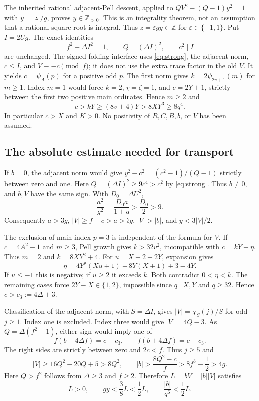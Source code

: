\documentclass[11pt]{article}
\theoremstyle{definition}
\newcommand{\Z}{\mathbb Z}\newcommand{\N}{\mathbb N}\newcommand{\Q}{\mathbb Q}
\begin{document}
The inherited rational adjacent-Pell descent, applied to
$QV^2-(Q-1)y^2=1$ with $y=|z|/g$, proves $y\in\Z_{>0}$.
This is an integrality theorem, not an assumption that a rational square
root is integral. Thus $z=\varepsilon gy\in\Z$ for
$\varepsilon\in\{-1,1\}$. Put $I=2Ug$. The exact identities
\begin{equation}\label{eq:strong}
 f^2-\Delta I^2=1,\qquad Q=(\Delta I)^2,\qquad c^2\mid I
\end{equation}
are unchanged. The signed folding interface uses \eqref{eq:strong},
the adjacent norm, $c\le I$, and $V\equiv-c\pmod f$; it does not use
the extra trace factor in the old $V$. It yields
$c=\psi_A(p)$ for a positive odd $p$.
The first norm gives $k=2\psi_{2v+1}(m)$ for $m\ge1$.
Index $m=1$ would force $k=2$, $\eta=\zeta=1$, and
$c=2Y+1$, strictly between the first two positive main ordinates.
Hence $m\ge2$ and
\begin{equation}\label{eq:earlyc}
              c>kY\ge(8v+4)Y>8XY^3\ge8q^4.
\end{equation}
In particular $c>X$ and $K>0$. No positivity of $R,C,B,b$, or $V$
has been assumed.

\subsection{The absolute estimate needed for transport}

If $b=0$, the adjacent norm would give
$y^2-c^2=(c^2-1)/(Q-1)$ strictly between zero and one.
Here $Q=(\Delta I)^2\ge9c^4>c^2$ by \eqref{eq:strong}.
Thus $b\ne0$, and $b,V$ have the same sign. With $D_0=\Delta U^2$,
\[
 \frac{a^2}{g^2}=\frac{D_0a}{1+a}>\frac{D_0}{2}>9.
\]
Consequently $a>3g$, $|V|\ge f-c>a>3g$, $|V|>|b|$, and
$y<3|V|/2$.

The exclusion of main index $p=3$ is independent of the formula for
$V$. If $c=4A^2-1$ and $m\ge3$, Pell growth gives $k>32v^2$,
incompatible with $c=kY+\eta$. Thus $m=2$ and $k=8XY^2+4$.
For $u=X+2-2Y$, expansion gives
\[
 \eta=4Y^2(Xu+1)+8Y(X+1)+3-4Y.
\]
If $u\le-1$ this is negative; if $u\ge2$ it exceeds $k$.
Both contradict $0<\eta<k$. The remaining cases force
$2Y-X\in\{1,2\}$, impossible since $q\mid X,Y$ and $q\ge32$.
Hence $c>c_3:=4\Delta+3$.

Classification of the adjacent norm, with $S=\Delta I$, gives
$|V|=\chi_S(j)/S$ for odd $j\ge1$. Index one is excluded.
Index three would give $|V|=4Q-3$. As $Q=\Delta(f^2-1)$,
either sign would imply one of
\[
 f(b-4\Delta f)=c-c_3,\qquad f(b+4\Delta f)=c+c_3.
\]
The right sides are strictly between zero and $2c<f$.
Thus $j\ge5$ and
\[
 |V|\ge16Q^2-20Q+5>8Q^2,\qquad
 |b|>\frac{8Q^2-c}{f}>8f^3-\frac12>4g.
\]
Here $Q>f^2$ follows from $\Delta\ge3$ and $f\ge2$.
Therefore $L=bV=|b||V|$ satisfies
\begin{equation}\label{eq:transportbound}
 L>0,\qquad gy<\frac38L<\frac12L,\qquad
 \frac{|b|}{q^6}<\frac12L.
\end{equation}
\end{document}
